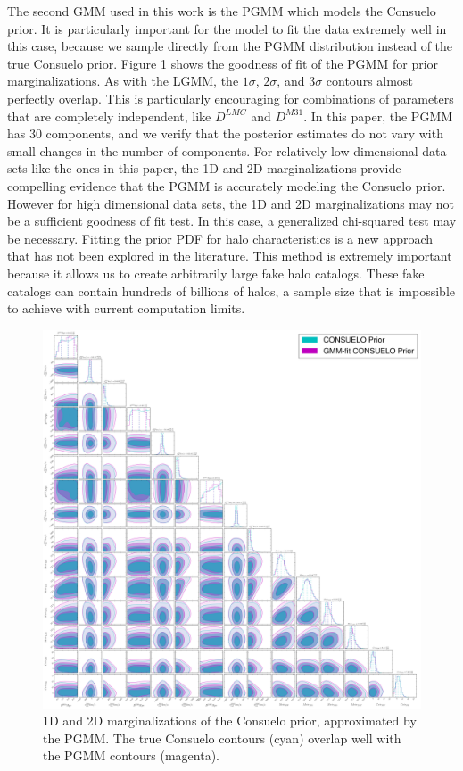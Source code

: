 \documentclass[iop,apj,twocolappendix,numberedappendix]{emulateapj}
\newcommand{\consuelo}{{\sc Consuelo }}
\begin{document}
The second GMM used in this work is the PGMM which models the \consuelo prior. It is particularly important for the model to fit the data extremely well in this case, because we sample directly from the PGMM distribution instead of the true \consuelo prior. Figure \ref{fig:Q_GMMP_GOF} shows the goodness of fit of the PGMM for prior marginalizations. 
As with the LGMM, the $1\sigma$, $2\sigma$, and $3\sigma$ contours almost perfectly overlap. 
This is particularly encouraging for combinations of parameters that are completely independent, like $D^{LMC}$ and $D^{M31}$. 
In this paper, the PGMM has 30 components, and we verify that the posterior estimates do not vary with small changes in the number of components. 
For relatively low dimensional data sets like the ones in this paper, the 1D and 2D marginalizations provide compelling evidence that the PGMM is accurately modeling the \consuelo prior. 
However for high dimensional data sets, the 1D and 2D marginalizations may not be a sufficient goodness of fit test.
In this case, a generalized chi-squared test may be necessary.
Fitting the prior PDF for halo characteristics is a new approach that has not been explored in the literature. 
This method is extremely important because it allows us to create arbitrarily large fake halo catalogs. 
These fake catalogs can contain hundreds of billions of halos, a sample size that is impossible to achieve with current computation limits.
\begin{figure}
\includegraphics[width=\linewidth]{figures/Q_GMMP_GOF.pdf}
\caption{1D and 2D marginalizations of the Consuelo prior, approximated by the PGMM. The true \consuelo contours (cyan) overlap well with the PGMM contours (magenta).}
\label{fig:Q_GMMP_GOF}
\end{figure}
\end{document}
